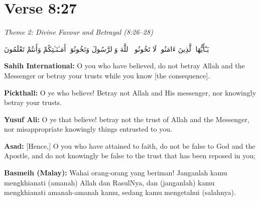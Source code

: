 \documentclass[11pt,a4paper,openany]{book}
\let\textAR\textarabic
\newcommand{\quranverse}[1]{{\centering\Large\textAR{#1}\par}}
\begin{document}
\newpage

\section{Verse 8:27}
{\small\color{accent2}\itshape Theme 2: Divine Favour and Betrayal (8:26--28)}


\begin{quranbox}[Qur'an 8:27]
\quranverse{يَـٰٓأَيُّهَا ٱلَّذِينَ ءَامَنُوا۟ لَا تَخُونُوا۟ ٱللَّهَ وَٱلرَّسُولَ وَتَخُونُوٓا۟ أَمَـٰنَـٰتِكُمْ وَأَنتُمْ تَعْلَمُونَ}

\vspace{6pt}
\noindent\textbf{Sahih International:} O you who have believed, do not betray Allah and the Messenger or betray your trusts while you know [the consequence].

\vspace{4pt}
\noindent\textbf{Pickthall:} O ye who believe! Betray not Allah and His messenger, nor knowingly betray your trusts.

\vspace{4pt}
\noindent\textbf{Yusuf Ali:} O ye that believe! betray not the trust of Allah and the Messenger, nor misappropriate knowingly things entrusted to you.

\vspace{4pt}
\noindent\textbf{Asad:} [Hence,] O you who have attained to faith, do not be false to God and the Apostle, and do not knowingly be false to the trust that has been reposed in you;

\vspace{4pt}
\noindent\textbf{Basmeih (Malay):} Wahai orang-orang yang beriman! Janganlah kamu mengkhianati (amanah) Allah dan RasulNya, dan (janganlah) kamu mengkhianati amanah-amanah kamu, sedang kamu mengetahui (salahnya).
\end{quranbox}
\end{document}
